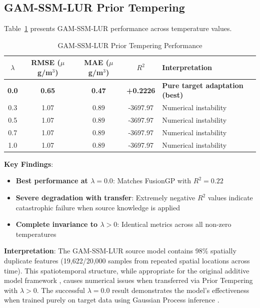 \subsection{GAM-SSM-LUR Prior Tempering}
\label{subsec:gam_pt}

Table~\ref{tab:gam_pt} presents GAM-SSM-LUR performance across temperature values.

\begin{table}[htbp]
\centering
\caption{GAM-SSM-LUR Prior Tempering Performance}
\label{tab:gam_pt}
\begin{tabular}{ccccp{4.5cm}}
\toprule
\(\lambda\) & RMSE (\(\mu\)g/m\(^3\)) & MAE (\(\mu\)g/m\(^3\)) & \(R^2\) & Interpretation \\
\midrule
\textbf{0.0} & \textbf{0.65} & \textbf{0.47} & \textbf{+0.2226} & \textbf{Pure target adaptation (best)} \\
0.3 & 1.07 & 0.89 & -3697.97 & Numerical instability \\
0.5 & 1.07 & 0.89 & -3697.97 & Numerical instability \\
0.7 & 1.07 & 0.89 & -3697.97 & Numerical instability \\
1.0 & 1.07 & 0.89 & -3697.97 & Numerical instability \\
\bottomrule
\end{tabular}
\end{table}

\textbf{Key Findings}:
\begin{itemize}
    \item \textbf{Best performance at \(\lambda=0.0\)}: Matches FusionGP with \(R^2=0.22\)
    \item \textbf{Severe degradation with transfer}: Extremely negative \(R^2\) values indicate catastrophic failure when source knowledge is applied
    \item \textbf{Complete invariance to \(\lambda>0\)}: Identical metrics across all non-zero temperatures
\end{itemize}

\textbf{Interpretation}: The GAM-SSM-LUR source model contains 98\% spatially duplicate features (19,622/20,000 samples from repeated spatial locations across time). This spatiotemporal structure, while appropriate for the original additive model framework \citet{wood2017generalized}, causes numerical issues when transferred via Prior Tempering with \(\lambda>0\). The successful \(\lambda=0.0\) result demonstrates the model's effectiveness when trained purely on target data using Gaussian Process inference \citet{rasmussen2006gaussian}.

